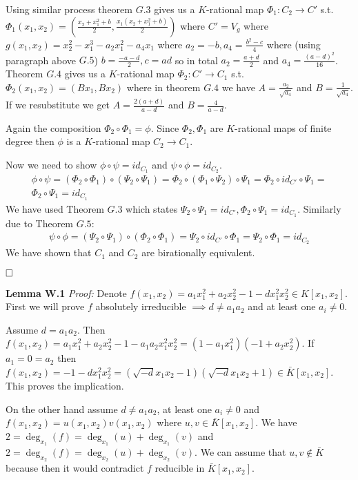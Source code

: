 \documentclass[12pt, a4paper]{article}
\newcommand{\qed}{\hfill\square}
\begin{document}
Using similar process theorem $G.3$ gives us a $K$-rational map $\Phi_1: C_2 \rightarrow C'$ s.t. $\Phi_1(x_1, x_2) = \left(\frac{x_2+x_1^2+b}{2}, \frac{x_1(x_2+x_1^2+b)}{2} \right)$ where $C' = V_g$ where $g(x_1,x_2) = x_2^2-x_1^3-a_2x_1^2-a_4x_1$ where $a_2 = -b, a_4 = \frac{b^2-c}{4}$ where (using paragraph above $G.5$) $b = \frac{-a-d}{2}, c = ad$ so in total $a_2 = \frac{a+d}{2}$ and $a_4 = \frac{(a-d)^2}{16}$. Theorem $G.4$ gives us a $K$-rational map $\Phi_2: C' \rightarrow C_1$ s.t. $\Phi_2(x_1, x_2) = (Bx_1, Bx_2)$ where in theorem $G.4$ we have $A = \frac{a_2}{\sqrt{a_4}}$ and $B = \frac{1}{\sqrt{a_4}}$. If we resubstitute we get $A = \frac{2(a+d)}{a-d}$ and $B = \frac{4}{a-d}$.

Again the composition $\Phi_2 \circ \Phi_1 = \phi$. Since $\Phi_2, \Phi_1$ are $K$-rational maps of finite degree then $\phi$ is a $K$-rational map $C_2 \rightarrow C_1$.

Now we need to show $\phi \circ \psi = id_{C_1}$ and $\psi \circ \phi = id_{C_2}$.
\begin{gather*}
\phi \circ \psi = (\Phi_2 \circ \Phi_1) \circ (\Psi_2 \circ \Psi_1) = \Phi_2 \circ (\Phi_1 \circ \Psi_2) \circ \Psi_1 = \Phi_2 \circ id_{C'} \circ \Psi_1 =\\
\Phi_2 \circ \Psi_1 = id_{C_1}
\end{gather*}
We have used Theorem $G.3$ which states $\Psi_2 \circ \Psi_1 = id_{C'}, \Phi_2 \circ \Psi_1 = id_{C_1}$. Similarly due to Theorem $G.5$:
\begin{gather*}
\psi \circ \phi = (\Psi_2 \circ \Psi_1) \circ (\Phi_2 \circ \Phi_1) = \Psi_2 \circ id_{C'} \circ \Phi_1 = \Psi_2 \circ \Phi_1 = id_{C_2}
\end{gather*}
We have shown that $C_1$ and $C_2$ are birationally equivalent.

$\qed$

\textbf{Lemma W.1} \textit{Proof:}
Denote $f(x_1,x_2) = a_1x_1^2+a_2x_2^2-1-dx_1^2x_2^2 \in K[x_1, x_2]$. First we will prove $f$ absolutely irreducible $\implies d \neq a_1a_2$ and at least one $a_i \neq 0$.

Assume $d = a_1a_2$. Then $f(x_1,x_2) = a_1x_1^2+a_2x_2^2-1-a_1a_2x_1^2x_2^2 = (1-a_1x_1^2)(-1+a_2x_2^2)$. If $a_1 = 0 = a_2$ then $f(x_1,x_2) = -1-dx_1^2x_2^2 = (\sqrt{-d}x_1x_2-1)(\sqrt{-d}x_1x_2+1) \in \bar{K}[x_1, x_2]$. This proves the implication.

On the other hand assume $d \neq a_1a_2$, at least one $a_i \neq 0$ and $f(x_1,x_2) = u(x_1,x_2)v(x_1,x_2)$ where $u,v \in \bar{K}[x_1,x_2]$. We have $2 = \deg_{x_1}(f) = \deg_{x_1}(u)+\deg_{x_1}(v)$ and $2 = \deg_{x_2}(f) = \deg_{x_2}(u)+\deg_{x_2}(v)$. We can assume that $u,v \notin \bar{K}$ because then it would contradict $f$ reducible in $\bar{K}[x_1,x_2]$.
\end{document}
